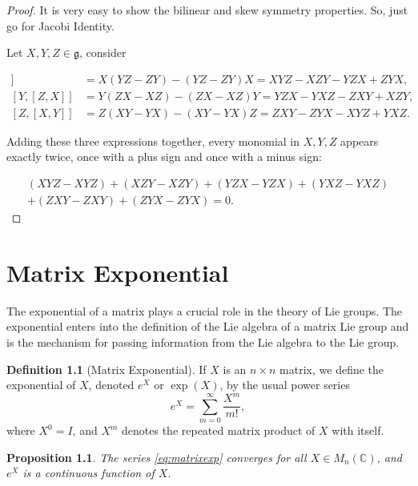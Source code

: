 \documentclass[
]{book}
\newtheorem{proposition}{Proposition}[chapter]
\theoremstyle{definition}
\newtheorem{definition}{Definition}[chapter]
\theoremstyle{definition}
\theoremstyle{definition}
\theoremstyle{definition}
\theoremstyle{remark}
\begin{document}
\begin{proof}
It is very easy to show the bilinear and skew symmetry properties. So, just go for Jacobi Identity.

Let \(X,Y,Z \in \mathfrak{g}\), consider

\begin{align*}
[X,[Y,Z]] &= X(YZ - ZY) - (YZ - ZY)X = XYZ - XZY - YZX + ZYX,\\
[Y,[Z,X]] &= Y(ZX - XZ) - (ZX - XZ)Y = YZX - YXZ - ZXY + XZY,\\
[Z,[X,Y]] &= Z(XY - YX) - (XY - YX)Z = ZXY - ZYX - XYZ + YXZ.
\end{align*}

Adding these three expressions together, every monomial in \(X,Y,Z\) appears exactly twice, once with a plus sign and once with a minus sign:

\begin{align*}
(XYZ - XYZ) + (XZY - XZY) + (YZX - YZX) + (YXZ - YXZ) \\+ (ZXY - ZXY) + (ZYX - ZYX) = 0.
\end{align*}
\end{proof}

\chapter{Matrix Exponential}\label{matrix-exponential}

The exponential of a matrix plays a crucial role in the theory of Lie groups. The exponential enters into the definition of the Lie algebra of a matrix Lie group and is the mechanism for passing information from the Lie algebra to the Lie group.

\begin{definition}[Matrix Exponential]
\protect\hypertarget{def:mat_exp}{}\label{def:mat_exp}If \(X\) is an \(n \times n\) matrix, we define the exponential of \(X\), denoted \(e^X\) or \(\exp(X)\), by the usual power series
\begin{equation}
e^X = \sum_{m=0}^{\infty} \frac{X^m}{m!},\label{eq:matrixexp}
\end{equation}
where \(X^0=I\), and \(X^m\) denotes the repeated matrix product of \(X\) with itself.
\end{definition}

\begin{proposition}
\protect\hypertarget{prp:unnamed-chunk-15}{}\label{prp:unnamed-chunk-15}The series \eqref{eq:matrixexp} converges for all \(X \in M_n(\mathbb{C})\), and \(e^X\) is a continuous function of \(X\).
\end{proposition}
\end{document}
